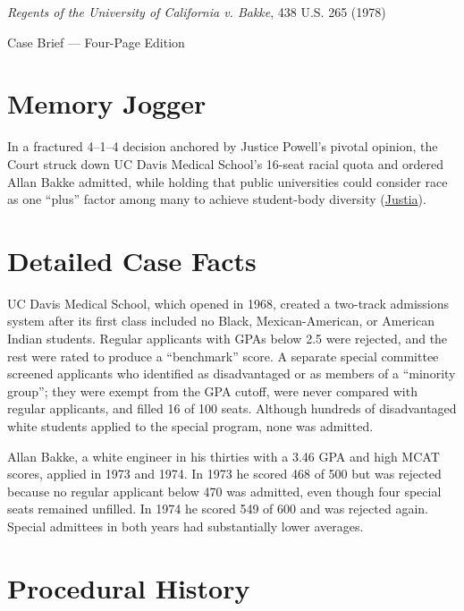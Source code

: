 \documentclass[12pt]{article}
\begin{document}
\begin{center}
{\LARGE \textit{Regents of the University of California v. Bakke}, 438 U.S. 265 (1978)\par}
\vspace{0.8em}
{\large Case Brief --- Four-Page Edition\par}
\end{center}
\vspace{1em}

\section{Memory Jogger}

In a fractured 4--1--4 decision anchored by Justice Powell's pivotal opinion, the Court struck down UC Davis Medical School's 16-seat racial quota and ordered Allan Bakke admitted, while holding that public universities could consider race as one ``plus'' factor among many to achieve student-body diversity (\href{https://supreme.justia.com/cases/federal/us/438/265/}{Justia}).

\section{Detailed Case Facts}

UC Davis Medical School, which opened in 1968, created a two-track admissions system after its first class included no Black, Mexican-American, or American Indian students. Regular applicants with GPAs below 2.5 were rejected, and the rest were rated to produce a ``benchmark'' score. A separate special committee screened applicants who identified as disadvantaged or as members of a ``minority group''; they were exempt from the GPA cutoff, were never compared with regular applicants, and filled 16 of 100 seats. Although hundreds of disadvantaged white students applied to the special program, none was admitted.

Allan Bakke, a white engineer in his thirties with a 3.46 GPA and high MCAT scores, applied in 1973 and 1974. In 1973 he scored 468 of 500 but was rejected because no regular applicant below 470 was admitted, even though four special seats remained unfilled. In 1974 he scored 549 of 600 and was rejected again. Special admittees in both years had substantially lower averages.

\section{Procedural History}
\end{document}
